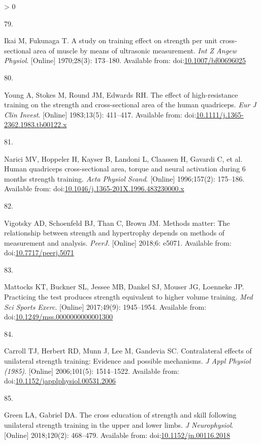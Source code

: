 \documentclass[twoside,10pt]{gihclass} %
\newlength{\cslhangindent}
\newlength{\csllabelwidth}
\newenvironment{CSLReferences}[3] %
 {%
  \setlength{\parindent}{0pt}
  \ifodd #1 \everypar{\setlength{\hangindent}{\cslhangindent}}\ignorespaces\fi
  \ifnum #2 > 0
  \setlength{\parskip}{#2\baselineskip}
  \fi
 }%
 {}
\newcommand{\CSLLeftMargin}[1]{\parbox[t]{\maxof{\widthof{#1}}{\csllabelwidth}}{#1}}
\newcommand{\CSLRightInline}[1]{\parbox[t]{\linewidth}{#1}}
\begin{document}
\begin{CSLReferences}{0}{0}
\leavevmode\hypertarget{ref-RN2629}{}%
\CSLLeftMargin{79. }
\CSLRightInline{Ikai M, Fukunaga T. A study on training effect on strength per unit cross-sectional area of muscle by means of ultrasonic measurement. \emph{Int Z Angew Physiol}. {[}Online{]} 1970;28(3): 173--180. Available from: doi:\href{https://doi.org/10.1007/bf00696025}{10.1007/bf00696025}}

\leavevmode\hypertarget{ref-RN2737}{}%
\CSLLeftMargin{80. }
\CSLRightInline{Young A, Stokes M, Round JM, Edwards RH. The effect of high-resistance training on the strength and cross-sectional area of the human quadriceps. \emph{Eur J Clin Invest}. {[}Online{]} 1983;13(5): 411--417. Available from: doi:\href{https://doi.org/10.1111/j.1365-2362.1983.tb00122.x}{10.1111/j.1365-2362.1983.tb00122.x}}

\leavevmode\hypertarget{ref-RN2735}{}%
\CSLLeftMargin{81. }
\CSLRightInline{Narici MV, Hoppeler H, Kayser B, Landoni L, Claassen H, Gavardi C, et al. Human quadriceps cross-sectional area, torque and neural activation during 6 months strength training. \emph{Acta Physiol Scand}. {[}Online{]} 1996;157(2): 175--186. Available from: doi:\href{https://doi.org/10.1046/j.1365-201X.1996.483230000.x}{10.1046/j.1365-201X.1996.483230000.x}}

\leavevmode\hypertarget{ref-RN2158}{}%
\CSLLeftMargin{82. }
\CSLRightInline{Vigotsky AD, Schoenfeld BJ, Than C, Brown JM. Methods matter: The relationship between strength and hypertrophy depends on methods of measurement and analysis. \emph{PeerJ}. {[}Online{]} 2018;6: e5071. Available from: doi:\href{https://doi.org/10.7717/peerj.5071}{10.7717/peerj.5071}}

\leavevmode\hypertarget{ref-RN2760}{}%
\CSLLeftMargin{83. }
\CSLRightInline{Mattocks KT, Buckner SL, Jessee MB, Dankel SJ, Mouser JG, Loenneke JP. Practicing the test produces strength equivalent to higher volume training. \emph{Med Sci Sports Exerc}. {[}Online{]} 2017;49(9): 1945--1954. Available from: doi:\href{https://doi.org/10.1249/mss.0000000000001300}{10.1249/mss.0000000000001300}}

\leavevmode\hypertarget{ref-RN2219}{}%
\CSLLeftMargin{84. }
\CSLRightInline{Carroll TJ, Herbert RD, Munn J, Lee M, Gandevia SC. Contralateral effects of unilateral strength training: Evidence and possible mechanisms. \emph{J Appl Physiol (1985)}. {[}Online{]} 2006;101(5): 1514--1522. Available from: doi:\href{https://doi.org/10.1152/japplphysiol.00531.2006}{10.1152/japplphysiol.00531.2006}}

\leavevmode\hypertarget{ref-RN2766}{}%
\CSLLeftMargin{85. }
\CSLRightInline{Green LA, Gabriel DA. The cross education of strength and skill following unilateral strength training in the upper and lower limbs. \emph{J Neurophysiol}. {[}Online{]} 2018;120(2): 468--479. Available from: doi:\href{https://doi.org/10.1152/jn.00116.2018}{10.1152/jn.00116.2018}}


\end{CSLReferences}
\end{document}
